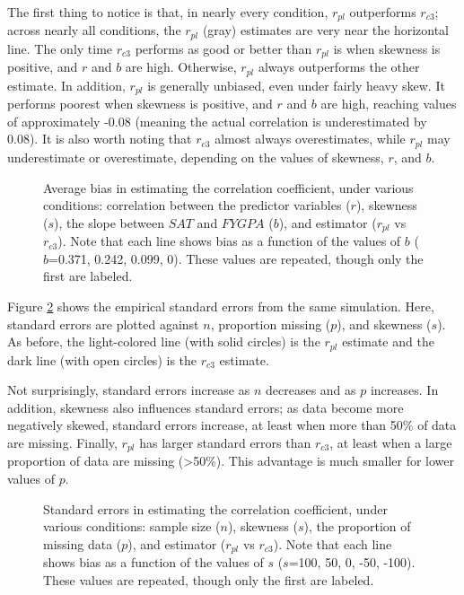 \documentclass[english,man]{apa6}
\theoremstyle{definition}
\theoremstyle{definition}
\theoremstyle{remark}
\begin{document}
The first thing to notice is that, in nearly every condition, \(r_{pl}\)
outperforms \(r_{c3}\); across nearly all conditions, the \(r_{pl}\)
(gray) estimates are very near the horizontal line. The only time
\(r_{c3}\) performs as good or better than \(r_{pl}\) is when skewness
is positive, and \(r\) and \(b\) are high. Otherwise, \(r_{pl}\) always
outperforms the other estimate. In addition, \(r_{pl}\) is generally
unbiased, even under fairly heavy skew. It performs poorest when
skewness is positive, and \(r\) and \(b\) are high, reaching values of
approximately -0.08 (meaning the actual correlation is underestimated by
0.08). It is also worth noting that \(r_{c3}\) almost always
overestimates, while \(r_{pl}\) may underestimate or overestimate,
depending on the values of skewness, \(r\), and \(b\).

\begin{figure}[htbp]
\begin{center}
\caption{Average bias in estimating the correlation coefficient, under various conditions: correlation between the predictor variables ($r$), skewness ($s$), the slope between $SAT$ and $FYGPA$ ($b$), and estimator ($r_{pl}$ vs $r_{c3}$). Note that each line shows bias as a function of the values of $b$ ($b$=0.371, 0.242, 0.099, 0). These values are repeated, though only the first are labeled.}
\label{fig:results}
\end{center}
\end{figure}

Figure \ref{fig:se} shows the empirical standard errors from the same
simulation. Here, standard errors are plotted against \(n\), proportion
missing (\(p\)), and skewness (\(s\)). As before, the light-colored line
(with solid circles) is the \(r_{pl}\) estimate and the dark line (with
open circles) is the \(r_{c3}\) estimate.

Not surprisingly, standard errors increase as \(n\) decreases and as
\(p\) increases. In addition, skewness also influences standard errors;
as data become more negatively skewed, standard errors increase, at
least when more than 50\% of data are missing. Finally, \(r_{pl}\) has
larger standard errors than \(r_{c3}\), at least when a large proportion
of data are missing (\textgreater{}50\%). This advantage is much smaller
for lower values of \(p\).

\begin{figure}[htbp]
\begin{center}
\caption{Standard errors in estimating the correlation coefficient, under various conditions: sample size ($n$), skewness ($s$), the proportion of missing data ($p$), and estimator ($r_{pl}$ vs $r_{c3}$). Note that each line shows bias as a function of the values of $s$ ($s$=100, 50, 0, -50, -100). These values are repeated, though only the first are labeled.}
\label{fig:se}
\end{center}
\end{figure}
\end{document}
